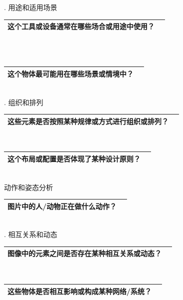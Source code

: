 \documentclass[12pt]{book}
\begin{document}
. 用途和适用场景

\begin{tabular}{|p{15cm}|p{3cm}|}
	\hline
这个工具或设备通常在哪些场合或用途中使用？\\
	\hline
\end{tabular}\\\\



\begin{tabular}{|p{15cm}|p{3cm}|}
	\hline
这个物体最可能用在哪些场景或情境中？\\
	\hline
\end{tabular}\\


. 组织和排列

\begin{tabular}{|p{15cm}|p{3cm}|}
	\hline
这些元素是否按照某种规律或方式进行组织或排列？\\
	\hline
\end{tabular}\\



\begin{tabular}{|p{15cm}|p{3cm}|}
	\hline
这个布局或配置是否体现了某种设计原则？\\
	\hline
\end{tabular}\\

\bigskip
动作和姿态分析

\begin{tabular}{|p{15cm}|p{3cm}|}
	\hline
	图片中的人/动物正在做什么动作？\\
	\hline
\end{tabular}\\


. 相互关系和动态

\begin{tabular}{|p{15cm}|p{3cm}|}
	\hline
图像中的元素之间是否存在某种相互关系或动态？\\
	\hline
\end{tabular}\\



\begin{tabular}{|p{15cm}|p{3cm}|}
	\hline
这些物体是否相互影响或构成某种网络/系统？\\
	\hline
\end{tabular}\\
\end{document}
